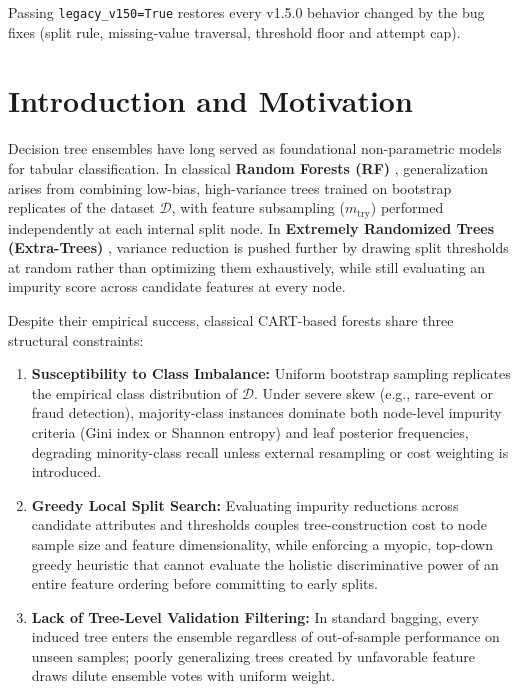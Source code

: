 \documentclass[11pt,a4paper]{article}
\newcommand{\code}[1]{\texttt{#1}}
\begin{document}
Passing \code{legacy\_v150=True} restores every v1.5.0 behavior changed by the bug fixes (split rule, missing-value traversal, threshold floor and attempt cap).

\section{Introduction and Motivation}

Decision tree ensembles have long served as foundational non-parametric models for tabular classification. In classical \textbf{Random Forests (RF)} \citep{breiman2001}, generalization arises from combining low-bias, high-variance trees trained on bootstrap replicates of the dataset $\mathcal{D}$, with feature subsampling ($m_{\text{try}}$) performed independently at each internal split node. In \textbf{Extremely Randomized Trees (Extra-Trees)} \citep{geurts2006}, variance reduction is pushed further by drawing split thresholds at random rather than optimizing them exhaustively, while still evaluating an impurity score across candidate features at every node.

Despite their empirical success, classical CART-based forests share three structural constraints:
\begin{enumerate}[leftmargin=*, itemsep=3pt]
  \item \textbf{Susceptibility to Class Imbalance:} Uniform bootstrap sampling replicates the empirical class distribution of $\mathcal{D}$. Under severe skew (e.g., rare-event or fraud detection), majority-class instances dominate both node-level impurity criteria (Gini index or Shannon entropy) and leaf posterior frequencies, degrading minority-class recall unless external resampling or cost weighting is introduced.
  \item \textbf{Greedy Local Split Search:} Evaluating impurity reductions across candidate attributes and thresholds couples tree-construction cost to node sample size and feature dimensionality, while enforcing a myopic, top-down greedy heuristic that cannot evaluate the holistic discriminative power of an entire feature ordering before committing to early splits.
  \item \textbf{Lack of Tree-Level Validation Filtering:} In standard bagging, every induced tree enters the ensemble regardless of out-of-sample performance on unseen samples; poorly generalizing trees created by unfavorable feature draws dilute ensemble votes with uniform weight.
\end{enumerate}
\end{document}
